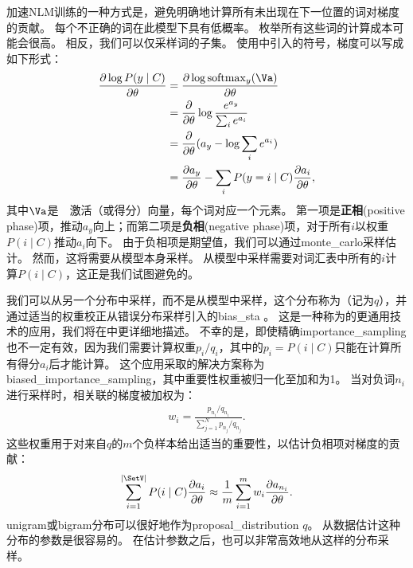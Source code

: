 \subsubsection{}
\label{sec:importance_sampling_chap12}
加速\gls{NLM}训练的一种方式是，避免明确地计算所有未出现在下一位置的词对梯度的贡献。
每个不正确的词在此模型下具有低概率。
枚举所有这些词的计算成本可能会很高。
相反，我们可以仅采样词的子集。
使用中引入的符号，梯度可以写成如下形式：
\begin{align}
 \frac{\partial \log P(y \mid C)}{\partial \theta} &= \frac{\partial \log {\rm softmax}_y(\Va)}{\partial \theta} \\ 
  &= \frac{\partial}{\partial \theta} \log \frac{e^{a_y}}{\sum_i e^{a_i}} \\ 
 &= \frac{\partial}{\partial \theta} (a_y - \log \sum_i e^{a_i}) \\ 
 &= \frac{\partial a_y}{\partial \theta}  - \sum_i P(y = i \mid C) \frac{\partial a_i}{\partial \theta},
\end{align}
其中$\Va$是~~激活（或得分）向量，每个词对应一个元素。
第一项是\textbf{正相}(positive phase)项，推动$a_y$向上；而第二项是\textbf{负相}(negative phase)项，对于所有$i$以权重$P(i \mid C)$推动$a_i$向下。
由于负相项是期望值，我们可以通过\gls{monte_carlo}采样估计。
然而，这将需要从模型本身采样。
从模型中采样需要对词汇表中所有的$i$计算$P(i \mid C)$，这正是我们试图避免的。

我们可以从另一个分布中采样，而不是从模型中采样，这个分布称为（记为$q$），并通过适当的权重校正从错误分布采样引入的\gls{bias_sta} \citep{Bengio+Senecal-2003-small,Bengio+Senecal-2008}。
这是一种称为的更通用技术的应用，我们将在中更详细地描述。
不幸的是，即使精确\gls{importance_sampling}也不一定有效，因为我们需要计算权重$p_i / q_i$，其中的$p_i = P(i \mid C)$只能在计算所有得分$a_i$后才能计算。
这个应用采取的解决方案称为\gls{biased_importance_sampling}，其中重要性权重被归一化至加和为1。
当对负词$n_i$进行采样时，相关联的梯度被加权为：
\begin{align}
  w_i = \frac{p_{n_i} / q_{n_i}}{\sum_{j=1}^N p_{n_j} / q_{n_j}}.
\end{align}
这些权重用于对来自$q$的$m$个负样本给出适当的重要性，以估计负相项对梯度的贡献：
\begin{align}
  \sum_{i=1}^{|\SetV|} P(i \mid C) \frac{\partial a_i}{\partial \theta}  \approx \frac{1}{m} \sum_{i=1}^m w_i \frac{\partial a_{n_i}}{\partial \theta}.
  \end{align}
  \gls{unigram}或\gls{bigram}分布可以很好地作为\gls{proposal_distribution} $q$。
从数据估计这种分布的参数是很容易的。
在估计参数之后，也可以非常高效地从这样的分布采样。

